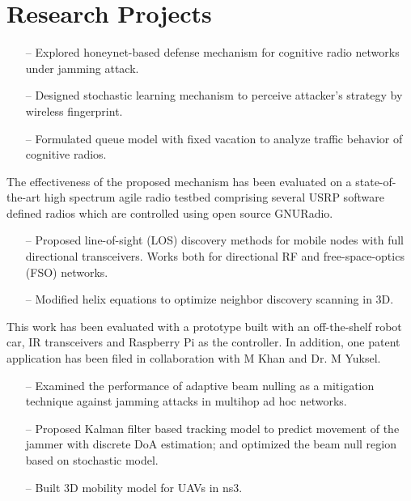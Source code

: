 \documentclass[11pt,letterpaper,sans]{moderncv}   %
\begin{document}
\section{Research Projects}
  {
  \begin{itemize}
    \item[--] Explored honeynet-based defense mechanism for cognitive radio networks under jamming attack.
    \item[--] Designed stochastic learning mechanism to perceive attacker's strategy by wireless fingerprint. 
    \item[--] Formulated queue model with fixed vacation to analyze traffic behavior of cognitive radios.
  \end{itemize}
  The effectiveness of the proposed mechanism has been evaluated on a state-of-the-art high spectrum agile radio testbed comprising several USRP software defined radios which are controlled using open source GNURadio.
  }

  {
  \begin{itemize}
    \item[--] Proposed line-of-sight (LOS) discovery methods for mobile nodes with full directional transceivers. Works both for directional RF and free-space-optics (FSO) networks.
    \item[--] Modified helix equations to optimize neighbor discovery scanning in 3D. 
  \end{itemize}
  This work has been evaluated with a prototype built with an off-the-shelf robot car, IR transceivers and Raspberry Pi as the controller. In addition, one patent application has been filed in collaboration with M Khan and Dr. M Yuksel.
  }



  {
  \begin{itemize}
    \item[--] Examined the performance of adaptive beam nulling as a mitigation technique against jamming attacks in multihop ad hoc networks. 
    \item[--] Proposed Kalman filter based tracking model to predict movement of the jammer with discrete DoA estimation; and optimized the beam null region based on stochastic model.
    \item[--] Built 3D mobility model for UAVs in ns3.
  \end{itemize}
  }
\end{document}
